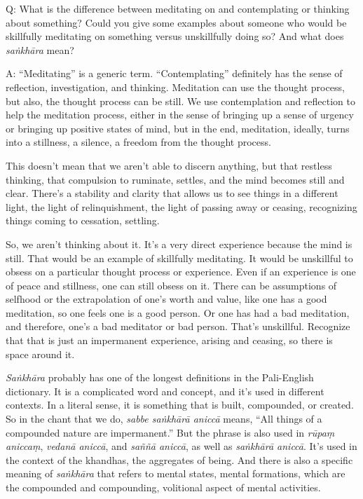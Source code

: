 \qaspace
Q: What is the difference between meditating on and contemplating or
thinking about something? Could you give some examples about someone who
would be skillfully meditating on something versus unskillfully doing
so? And what does \emph{saṅkhāra} mean?

\qaspace
A: “Meditating” is a generic term. “Contemplating” definitely has the
sense of reflection, investigation, and thinking. Meditation can use the
thought process, but also, the thought process can be still. We use
contemplation and reflection to help the meditation process, either in
the sense of bringing up a sense of urgency or bringing up positive
states of mind, but in the end, meditation, ideally, turns into a
stillness, a silence, a freedom from the thought process.

This doesn’t mean that we aren’t able to discern anything, but that
restless thinking, that compulsion to ruminate, settles, and the mind
becomes still and clear. There’s a stability and clarity that allows us
to see things in a different light, the light of relinquishment, the
light of passing away or ceasing, recognizing things coming to
cessation, settling.

So, we aren’t thinking about it. It’s a very direct experience because
the mind is still. That would be an example of skillfully meditating. It
would be unskillful to obsess on a particular thought process or
experience. Even if an experience is one of peace and stillness, one can
still obsess on it. There can be assumptions of selfhood or the
extrapolation of one’s worth and value, like one has a good meditation,
so one feels one is a good person. Or one has had a bad meditation, and
therefore, one’s a bad meditator or bad person. That’s unskillful.
Recognize that that is just an impermanent experience, arising and
ceasing, so there is space around it.

\emph{Saṅkhāra} probably has one of the longest definitions in the
Pali-English dictionary. It is a complicated word and concept, and it’s
used in different contexts. In a literal sense, it is something that is
built, compounded, or created. So in the chant that we do, \emph{sabbe
saṅkhārā aniccā} means, “All things of a compounded nature are
impermanent.” But the phrase is also used in \emph{rūpaṃ aniccaṃ},
\emph{vedanā aniccā}, and \emph{saññā aniccā}, as well as \emph{saṅkhārā
aniccā}. It’s used in the context of the khandhas, the aggregates of
being. And there is also a specific meaning of \emph{saṅkhāra} that
refers to mental states, mental formations, which are the compounded and
compounding, volitional aspect of mental activities.

